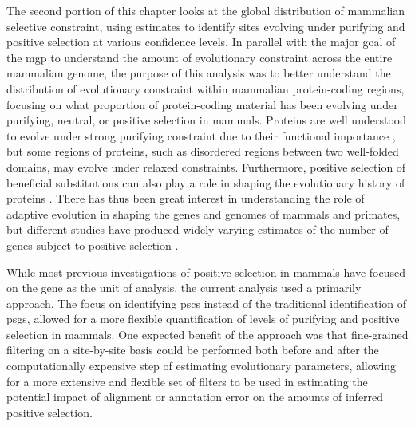 The second portion of this chapter looks at the global distribution of
mammalian selective constraint, using \sw estimates to identify sites
evolving under purifying and positive selection at various confidence
levels. In parallel with the major goal of the \ac{mgp} to understand
the amount of evolutionary constraint across the entire mammalian
genome, the purpose of this analysis was to better understand the
distribution of evolutionary constraint within mammalian
protein-coding regions, focusing on what proportion of protein-coding
material has been evolving under purifying, neutral, or positive
selection in mammals. Proteins are well understood to evolve under
strong purifying constraint due to their functional importance
\citep{Fay2003}, but some regions of proteins, such as disordered
regions between two well-folded domains, may evolve under relaxed
constraints. Furthermore, positive selection of beneficial
substitutions can also play a role in shaping the evolutionary history
of proteins \citep{Pal2006}. There has thus been great interest in
understanding the role of adaptive evolution in shaping the genes and
genomes of mammals and primates, but different studies have produced
widely varying estimates of the number of genes subject to positive
selection \citep{MarquesBonet2009a,Ellegren2008}.

While most previous investigations of positive selection in mammals
have focused on the gene as the unit of analysis, the current analysis
used a primarily \sw approach. The focus on identifying \acp{psc}
instead of the traditional identification of \acp{psg}, allowed for a
more flexible quantification of levels of purifying and positive
selection in mammals. One expected benefit of the \sw approach was
that fine-grained filtering on a site-by-site basis could be performed
both before and after the computationally expensive step of estimating
evolutionary parameters, allowing for a more extensive and flexible
set of filters to be used in estimating the potential impact of
alignment or annotation error on the amounts of inferred positive
selection.

